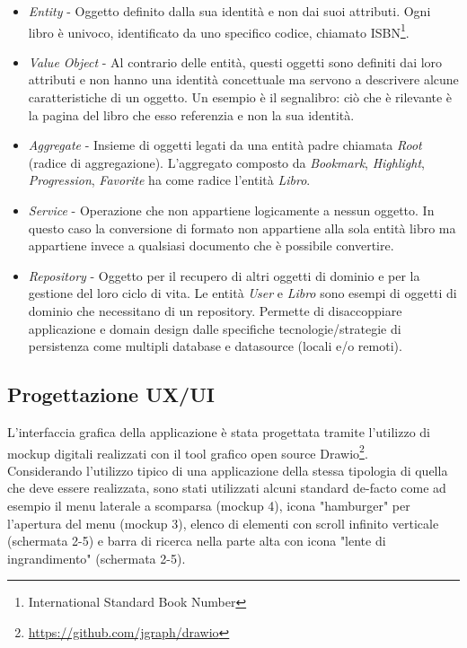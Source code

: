 \begin{itemize}
    \item \textit{Entity} - Oggetto definito dalla sua identità e non dai suoi attributi. Ogni libro è univoco, identificato da uno specifico codice, chiamato ISBN\footnote{International Standard Book Number}.
    \item \textit{Value Object} - Al contrario delle entità, questi oggetti sono definiti dai loro attributi e non hanno una identità concettuale ma servono a descrivere alcune caratteristiche di un oggetto. Un esempio è il segnalibro: ciò che è rilevante è la pagina del libro che esso referenzia e non la sua identità.
    \item \textit{Aggregate} - Insieme di oggetti legati da una entità padre chiamata \textit{Root} (radice di aggregazione). L'aggregato composto da \textit{Bookmark}, \textit{Highlight}, \textit{Progression}, \textit{Favorite} ha come radice l'entità \textit{Libro}.
    \item \textit{Service} - Operazione che non appartiene logicamente a nessun oggetto. In questo caso la conversione di formato non appartiene alla sola entità libro ma appartiene invece a qualsiasi documento che è possibile convertire.
    \item \textit{Repository} - Oggetto per il recupero di altri oggetti di dominio e per la gestione del loro ciclo di vita. Le entità \textit{User} e \textit{Libro} sono esempi di oggetti di dominio che necessitano di un repository. Permette di disaccoppiare applicazione e domain design dalle specifiche tecnologie/strategie di persistenza come multipli database e datasource (locali e/o remoti).
\end{itemize}

\subsection{Progettazione UX/UI}

L'interfaccia grafica della applicazione è stata progettata tramite l'utilizzo di mockup digitali realizzati con il tool grafico open source Drawio\footnote{\url{https://github.com/jgraph/drawio}}.\\
Considerando l'utilizzo tipico di una applicazione della stessa tipologia di quella che deve essere realizzata, sono stati utilizzati alcuni standard de-facto come ad esempio il menu laterale a scomparsa (mockup 4), icona "hamburger" per l'apertura del menu (mockup 3), elenco di elementi con scroll infinito verticale (schermata 2-5) e barra di ricerca nella parte alta con icona "lente di ingrandimento" (schermata 2-5).

